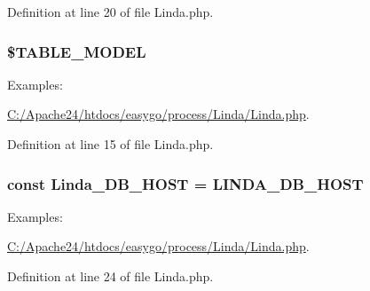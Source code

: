 Definition at line 20 of file Linda.\+php.

\hypertarget{class_linda_a486c281995ea6cdb9fb0367b6e260b76}{}
\subsubsection[{\$\+T\+A\+B\+L\+E\+\_\+\+M\+O\+D\+E\+L}]{\setlength{\rightskip}{0pt plus 5cm}\$T\+A\+B\+L\+E\+\_\+\+M\+O\+D\+E\+L\hspace{0.3cm}{\ttfamily [protected]}}\label{class_linda_a486c281995ea6cdb9fb0367b6e260b76}
\begin{Desc}
\item[Examples\+: ]\par
\hyperlink{_c_1_2_apache24_2htdocs_2easygo_2process_2_linda_2_linda_8php-example}{C\+:/\+Apache24/htdocs/easygo/process/\+Linda/\+Linda.\+php}.\end{Desc}


Definition at line 15 of file Linda.\+php.

\hypertarget{class_linda_a4771733014ade9011a85f4d01b24f2fe}{}
\subsubsection[{Linda\+\_\+\+D\+B\+\_\+\+H\+O\+S\+T}]{\setlength{\rightskip}{0pt plus 5cm}const Linda\+\_\+\+D\+B\+\_\+\+H\+O\+S\+T = {\bf L\+I\+N\+D\+A\+\_\+\+D\+B\+\_\+\+H\+O\+S\+T}}\label{class_linda_a4771733014ade9011a85f4d01b24f2fe}
\begin{Desc}
\item[Examples\+: ]\par
\hyperlink{_c_1_2_apache24_2htdocs_2easygo_2process_2_linda_2_linda_8php-example}{C\+:/\+Apache24/htdocs/easygo/process/\+Linda/\+Linda.\+php}.\end{Desc}


Definition at line 24 of file Linda.\+php.

\hypertarget{class_linda_aab80e54270eaebb370e54ec5232be43a}{}
